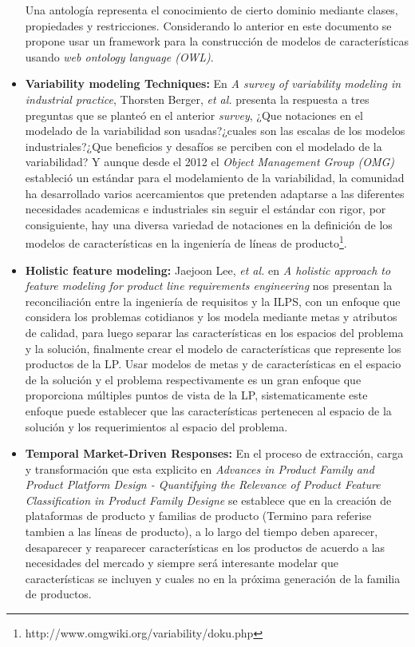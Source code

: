 \begin{itemize}
	Una antología representa el conocimiento de cierto dominio mediante clases, propiedades y restricciones. Considerando lo anterior en este documento se propone usar un framework para la construcción de modelos de características usando \textit{web ontology language (OWL)}.
	\item {\textbf{Variability modeling Techniques:}}
	En \textit{A survey of variability modeling in industrial practice}\cite{Berger2013},  Thorsten Berger, \textit{et al.} presenta la respuesta a tres preguntas que se planteó en el anterior \textit{survey}, ¿Que notaciones en el modelado de la variabilidad son usadas?¿cuales son las escalas de los modelos industriales?¿Que beneficios y desafíos se perciben con el modelado de la variabilidad? Y aunque desde el 2012 el \textit{Object Management Group (OMG)} estableció un estándar para el modelamiento de la variabilidad, la comunidad ha desarrollado varios acercamientos que pretenden adaptarse a las diferentes necesidades academicas e industriales sin seguir el estándar con rigor, por consiguiente, hay una diversa variedad de notaciones en la definición de los modelos de características en la ingeniería de líneas de producto\footnote{http://www.omgwiki.org/variability/doku.php}.  
	\item {\textbf{Holistic feature modeling:}}
	Jaejoon Lee, \textit{et al.} en \textit{A holistic approach to feature modeling for product line requirements engineering}\cite{Lee2014} nos presentan la reconciliación entre la ingeniería de requisitos y la ILPS, con un enfoque que considera los problemas cotidianos y los modela mediante metas y atributos de calidad, para luego separar las características en los espacios del problema y la solución, finalmente crear el modelo de características que represente los productos de la LP. Usar modelos de metas y de características en el espacio de la solución y el problema respectivamente es un gran enfoque que proporciona múltiples puntos de vista de la LP, sistematicamente este enfoque puede establecer que las características pertenecen al espacio de la solución y los requerimientos al espacio del problema.
	\item {\textbf{Temporal Market-Driven Responses:}}
	En el proceso de extracción, carga y transformación que esta explicito en \textit{Advances in Product Family and Product Platform Design - Quantifying the Relevance of Product Feature Classification in Product Family Designe}\cite{Kwak2011} se establece que en la creación de plataformas de producto y familias de producto (Termino para referise tambien a las líneas de producto), a lo largo del tiempo deben aparecer, desaparecer y reaparecer características en los productos de acuerdo a las necesidades del mercado y siempre será interesante modelar que características se incluyen y cuales no en la próxima generación de la familia de productos.

\end{itemize}
